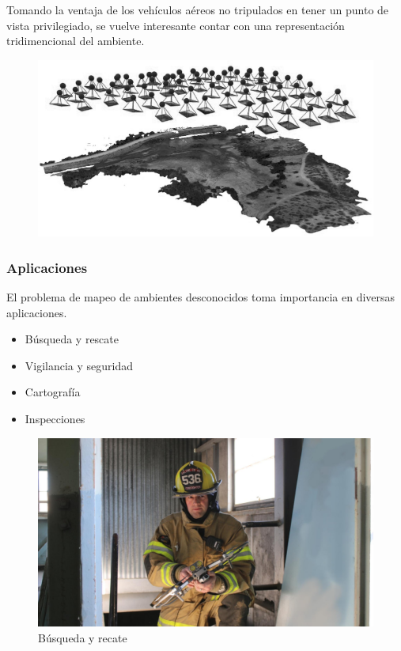 \documentclass[
	11pt, %
]{beamer}
\begin{document}
\begin{frame}

  Tomando la ventaja de los vehículos aéreos no tripulados en tener un punto de vista privilegiado, se vuelve interesante contar con una representación tridimencional del ambiente.
  
  \begin{figure}
    \includegraphics[width=0.7\linewidth]{drones_maps}
  \end{figure}
  
\end{frame}

\begin{frame}
  \frametitle{Aplicaciones}
  \bigskip %
  El problema de mapeo de ambientes desconocidos toma importancia en diversas aplicaciones.
  
  \begin{itemize}
  \item Búsqueda y rescate
  \item Vigilancia y seguridad
  \item Cartografía
  \item Inspecciones
  \end{itemize}
  
  \begin{figure}
    \includegraphics[width=0.5\linewidth]{search_rescue}
    \caption{Búsqueda y recate}
  \end{figure}
\end{frame}
\end{document}
